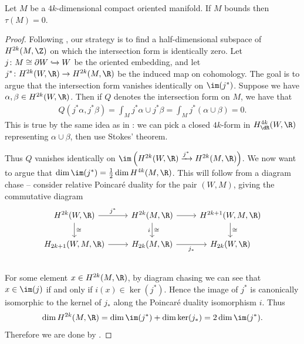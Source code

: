 \documentclass[11pt]{book}
\begin{document}
\begin{proposition}
\label{prop:manifold-which-bounds-has-signature-zero} 
Let $M$ be a $4k$-dimensional compact oriented manifold. If $M$ bounds then $\tau(M)=0$.
\end{proposition}
\begin{proof}
Following , our strategy is to find a half-dimensional subspace of $H^{2k}(M,\Z)$ on which the intersection form is identically zero. Let $j \colon M \cong \partial W \xhookrightarrow{} W$ be the oriented embedding, and let $j^\ast \colon H^{2k}(W,\R) \to H^{2k}(M,\R)$ be the induced map on cohomology.
The goal is to argue that the intersection form vanishes identically on $\im(j^\ast)$. Suppose we have $\alpha,\beta\in H^{2k}(W,\R)$. Then if $Q$ denotes the intersection form on $M$, we have that
\begin{align*}
    Q(j^\ast \alpha, j^\ast \beta) = \int_M j^\ast \alpha \cup j^\ast \beta = \int_M j^\ast(\alpha \cup \beta) = 0.
\end{align*}
This is true by the same idea as in : we can pick a closed $4k$-form in $H^{4k}_\dR(W,\R)$ representing $\alpha\cup\beta$, then use Stokes' theorem.

Thus $Q$ vanishes identically on $\im \left( H^{2k}(W,\R) \xto{j^\ast} H^{2k}(M,\R) \right)$. We now want to argue that $\dim \im(j^\ast) = \frac{1}{2}\dim H^{4k}(M,\R)$. This will follow from a diagram chase -- consider relative Poincar\'e duality for the pair $(W,M)$, giving the commutative diagram
\[ \begin{tikzcd}
    {H^{2k}(W,\R)}\rar["j^\ast"]\dar["\cong"] & {H^{2k}(M,\R)}\rar\dar["\cong" right, "i" left] &{H^{2k+1}(W,M,\R)} \dar["\cong"]\\
    {H_{2k+1}(W,M,\R)}\rar & {H_{2k}(M,\R)}\rar["j_\ast" below]  & {H_{2k}(W,\R)}\\
\end{tikzcd} \]
For some element $x\in H^{2k}(M,\R)$, by diagram chasing we can see that $x\in \im(j)$ if and only if $i(x) \in \ker(j^\ast)$. Hence the image of $j^\ast$ is canonically isomorphic to the kernel of $j_\ast$ along the Poincar\'e duality isomorphism $i$. Thus
\begin{align*}
    \dim H^{2k}(M,\R) = \dim \im(j^\ast) + \dim \ker(j_\ast) = 2\dim \im(j^\ast).
\end{align*}
Therefore we are done by .
\end{proof}
\end{document}
